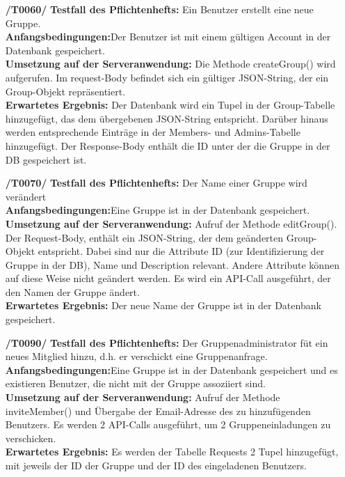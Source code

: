 \documentclass[11pt,a4paper]{scrartcl}
\begin{document}
\begin{enumerate}
	\item[\textbf{/T0060/}]
	\textbf{Testfall des Pflichtenhefts: }Ein Benutzer erstellt eine neue Gruppe.\\
	\textbf{Anfangsbedingungen:}Der Benutzer ist mit einem gültigen Account in der Datenbank gespeichert.\\
	\textbf{Umsetzung auf der Serveranwendung: }Die Methode createGroup() wird aufgerufen. Im request-Body befindet sich ein gültiger JSON-String, der ein Group-Objekt repräsentiert.\\
	\textbf{Erwartetes Ergebnis: }Der Datenbank wird ein Tupel in der Group-Tabelle hinzugefügt, das dem übergebenen JSON-String entspricht. Darüber hinaus werden entsprechende Einträge in der Members- und Admins-Tabelle hinzugefügt. Der Response-Body enthält die ID unter der die Gruppe in der DB gespeichert ist.
	
	\item[\textbf{/T0070/}]
	\textbf{Testfall des Pflichtenhefts: }Der Name einer Gruppe wird verändert\\
	\textbf{Anfangsbedingungen:}Eine Gruppe ist in der Datenbank gespeichert.\\
	\textbf{Umsetzung auf der Serveranwendung: }Aufruf der Methode editGroup(). Der Request-Body, enthält ein JSON-String, der dem geänderten Group-Objekt entspricht. Dabei sind nur die Attribute ID (zur Identifizierung der Gruppe in der DB), Name und Description relevant. Andere Attribute können auf diese Weise nicht geändert werden. Es wird ein API-Call ausgeführt, der den Namen der Gruppe ändert.\\
	\textbf{Erwartetes Ergebnis: }Der neue Name der Gruppe ist in der Datenbank gespeichert.
	
	\item[\textbf{/T0090/}]
	\textbf{Testfall des Pflichtenhefts: }Der Gruppenadministrator füt ein neues Mitglied hinzu, d.h. er verschickt eine Gruppenanfrage.\\
	\textbf{Anfangsbedingungen:}Eine Gruppe ist in der Datenbank gespeichert und es existieren Benutzer, die nicht mit der Gruppe assoziiert sind.\\
	\textbf{Umsetzung auf der Serveranwendung: }Aufruf der Methode inviteMember() und Übergabe der Email-Adresse des zu hinzufügenden Benutzers. Es werden 2 API-Calls ausgeführt, um 2 Gruppeneinladungen zu verschicken.\\
	\textbf{Erwartetes Ergebnis: }Es werden der Tabelle Requests 2 Tupel hinzugefügt, mit jeweils der ID der Gruppe und der ID des eingeladenen Benutzers.
	

\end{enumerate}
\end{document}
